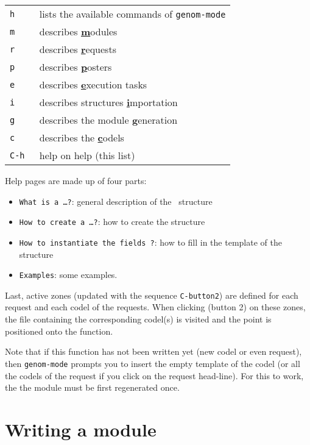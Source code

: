 {\small
\begin{tabular}{|l|p{10cm}|}
\hline
\tt h & lists the available commands of \texttt{genom-mode}  \\
\tt m & describes \underline{\textbf{m}}odules \\
\tt r & describes \underline{\textbf{r}}equests \\
\tt p & describes \underline{\textbf{p}}osters \\
\tt e & describes \underline{\textbf{e}}xecution tasks \\
\tt i & describes structures \underline{\textbf{i}}mportation \\
\tt g & describes the module \underline{\textbf{g}}eneration  \\
\tt c & describes the \underline{\textbf{c}}odels  \\
\tt C-h & help on help (this list) \\
\hline
\end{tabular}}

Help pages are made up of four parts:

\begin{itemize}
\item \texttt{What is a \ldots ?}: general description of the \GenoM\
structure
\item \texttt{How to create a \ldots ?}: how to create the structure
\item \texttt{How to instantiate the fields ?}: how to fill in the template
of the structure
\item \texttt{Examples}: some examples.
\end{itemize}

Last,  active   zones (updated  with   the sequence  \texttt{C-button2}) are
defined for each request and each codel  of the requests. When clicking
(button 2) on these zones, the file containing the corresponding codel(s)
is visited  and the point is positioned  onto the function. 

Note that if this function has not been written yet (new codel or even
request), then \texttt{genom-mode} prompts you to insert the empty template
of the codel (or all the codels of the request if you click on the request  
head-line). For this to work, the the module must be first regenerated once.

\section{Writing a module}

